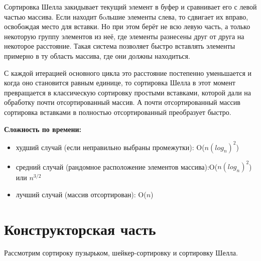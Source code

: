 \documentclass[a4paper]{article}
\begin{document}
	Сортировка Шелла закидывает текущий элемент в буфер и сравнивает его с левой частью массива. Если находит бoльшие элементы слева, то сдвигает их вправо, освобождая место для вставки. Но при этом берёт не всю левую часть, а только некоторую группу элементов из неё, где элементы разнесены друг от друга на некоторое расстояние. Такая система позволяет быстро вставлять элементы примерно в ту область массива, где они должны находиться.
	
	С каждой итерацией основного цикла это расстояние постепенно уменьшается и когда оно становится равным единице, то сортировка Шелла в этот момент превращается в классическую сортировку простыми вставками, которой дали на обработку почти отсортированный массив. А почти отсортированный массив сортировка вставками в полностью отсортированный преобразует быстро.
	\clearpage
	
	\textbf{Сложность по времени:}
	\begin{itemize}
		\item худший случай (если неправильно выбраны промежутки): O($n (log_{n})^{2}$) 
		\item средний случай (рандомное расположение элементов массива):O($n (log_{n})^{2}$) или $n^{3/2}$
		\item лучший случай (массив отсортирован): O($n$)
	\end{itemize}
	\clearpage
	\section{Конструкторская часть}
	Рассмотрим сортироку пузырьком, шейкер-сортировку и сортировку Шелла.
\end{document}
